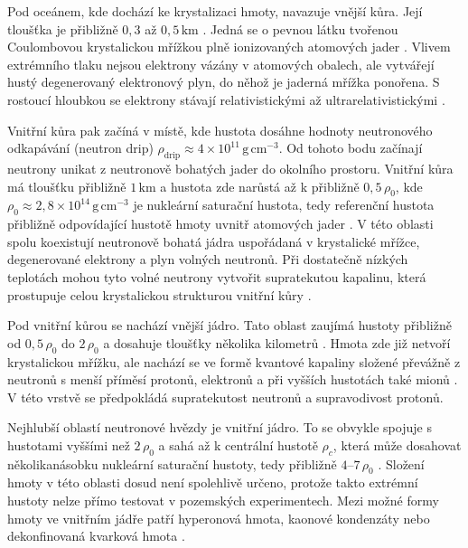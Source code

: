 \documentclass[%
final%
,htext%
]{ipothes}
\begin{document}
Pod oceánem, kde dochází ke krystalizaci hmoty, navazuje vnější kůra. Její tloušťka je přibližně $0{,}3$ až $0{,}5\,\mathrm{km}$ \cite{ghosh2007}. Jedná se o pevnou látku tvořenou Coulombovou krystalickou mřížkou plně ionizovaných atomových jader \cite{vidana2020}. Vlivem extrémního tlaku nejsou elektrony vázány v atomových obalech, ale vytvářejí hustý degenerovaný elektronový plyn, do něhož je jaderná mřížka ponořena. S rostoucí hloubkou se elektrony stávají relativistickými až ultrarelativistickými \cite{vidana2020}.

Vnitřní kůra pak začíná v místě, kde hustota dosáhne hodnoty neutronového odkapávání (neutron drip) $\rho_{\mathrm{drip}} \approx 4 \times 10^{11}\,\mathrm{g\,cm^{-3}}$. Od tohoto bodu začínají neutrony unikat z neutronově bohatých jader do okolního prostoru. Vnitřní kůra má tloušťku přibližně $1\,\mathrm{km}$ a hustota zde narůstá až k přibližně $0{,}5\,\rho_0$, kde $\rho_0 \approx 2{,}8 \times 10^{14}\,\mathrm{g\,cm^{-3}}$ je nukleární saturační hustota, tedy referenční hustota přibližně odpovídající hustotě hmoty uvnitř atomových jader \cite{vidana2020}. V této oblasti spolu koexistují neutronově bohatá jádra uspořádaná v krystalické mřížce, degenerované elektrony a plyn volných neutronů. Při dostatečně nízkých teplotách mohou tyto volné neutrony vytvořit supratekutou kapalinu, která prostupuje celou krystalickou strukturou vnitřní kůry \cite{ghosh2007}.

Pod vnitřní kůrou se nachází vnější jádro. Tato oblast zaujímá hustoty přibližně od $0{,}5\,\rho_0$ do $2\,\rho_0$ a dosahuje tloušťky několika kilometrů \cite{vidana2020}. Hmota zde již netvoří krystalickou mřížku, ale nachází se ve formě kvantové kapaliny složené převážně z neutronů s menší příměsí protonů, elektronů a při vyšších hustotách také mionů \cite{ghosh2007}. V této vrstvě se předpokládá supratekutost neutronů a supravodivost protonů.

Nejhlubší oblastí neutronové hvězdy je vnitřní jádro. To se obvykle spojuje s hustotami vyššími než $2\,\rho_0$ a sahá až k centrální hustotě $\rho_c$, která může dosahovat několikanásobku nukleární saturační hustoty, tedy přibližně $4$--$7\,\rho_0$ \cite{ghosh2007}. Složení hmoty v této oblasti dosud není spolehlivě určeno, protože takto extrémní hustoty nelze přímo testovat v pozemských experimentech. Mezi možné formy hmoty ve vnitřním jádře patří hyperonová hmota, kaonové kondenzáty nebo dekonfinovaná kvarková hmota \cite{vidana2020}.




\clearpage
\end{document}
